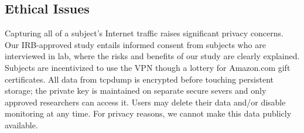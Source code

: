 



\subsection{Ethical Issues}
Capturing all of a subject's Internet traffic raises significant
privacy concerns. Our IRB-approved study entails informed consent from
subjects who are interviewed in lab, where the risks and benefits of
our study are clearly explained. Subjects are incentivized to use the
VPN though a lottery for Amazon.com gift certificates. All data from
tcpdump is encrypted before touching persistent storage; the private
key is maintained on separate secure severs and only approved
researchers can access it. Users may delete their data and/or disable
monitoring at any time. For privacy reasons, we cannot make this data
publicly available.


